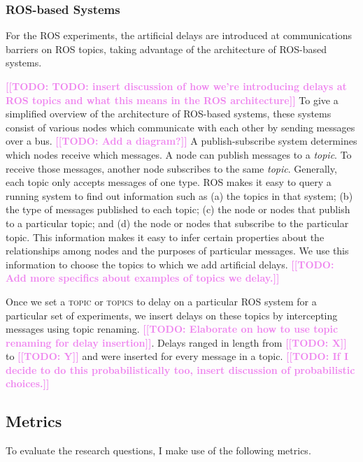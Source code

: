 \documentclass[conference]{IEEEtran}
\newcommand{\todo}[1]{\textcolor{violet}{{\bfseries [[TODO: #1]]}}}
\newcommand{\tool}[1]{\textsc{#1}}
\begin{document}
\subsubsection{\tool{ROS}-based Systems}
For the \tool{\ac{ROS}} experiments, the artificial delays are introduced at communications
barriers on ROS topics, taking advantage of the architecture of \tool{ROS}-based systems.


\todo{TODO: insert discussion of how we're introducing delays at ROS topics and what this means in the ROS architecture}
To give a simplified overview of the architecture of ROS-based systems,
these systems consist of various nodes which communicate with each other by
sending messages over a bus.
\todo{Add a diagram?}
A publish-subscribe system determines which nodes receive which messages.
A node can publish messages to a \emph{topic}.
To receive those messages, another node subscribes to the same \emph{topic}.
Generally, each topic only accepts messages of one type.
\tool{\ac{ROS}} makes it easy to query a running system to find out information
such as (a) the topics in that system; (b) the type of messages published to each
topic; (c) the node or nodes that publish to a particular topic; and (d) the node
or nodes that subscribe to the particular topic.
This information makes it easy to infer certain properties about the relationships
among nodes and the purposes of particular messages.
We use this information to choose the topics to which we add artificial delays.
\todo{Add more specifics about examples of topics we delay.}

Once we set a \tool{topic} or \tool{topics} to delay on a particular \tool{\ac{ROS}}
system for a particular set of experiments, we insert delays on these topics by
intercepting messages using topic renaming. \todo{Elaborate on how to use topic renaming for delay insertion}.
Delays ranged in length from \todo{X} to \todo{Y} and were inserted for every message
in a topic. \todo{If I decide to do this probabilistically too, insert discussion of
probabilistic choices.}

\subsection{Metrics}
\label{sec:timing-methodology-metrics}
To evaluate the research questions, I make use of the following metrics.
\end{document}
